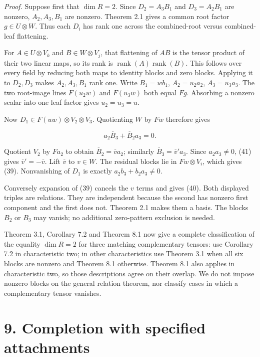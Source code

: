 \documentclass[11pt]{article}
\begin{document}
\emph{Proof.} Suppose first that $\dim R=2$. Since $D_2=A_3B_1$ and $D_3=A_2B_1$ are nonzero, $A_2,A_3,B_1$ are nonzero. Theorem 2.1 gives a common root factor $g\in U\otimes W$. Thus each $D_i$ has rank one across the combined-root versus combined-leaf flattening.


For $A\in U\otimes V_k$ and $B\in W\otimes V_j$, that flattening of $AB$ is the tensor product of their two linear maps, so its rank is $\operatorname{rank}(A)\operatorname{rank}(B)$. This follows over every field by reducing both maps to identity blocks and zero blocks. Applying it to $D_2,D_3$ makes $A_2,A_3,B_1$ rank one. Write $B_1=wb_1$, $A_2=u_2a_2$, $A_3=u_3a_3$. The two root-image lines $F(u_2w)$ and $F(u_3w)$ both equal $Fg$. Absorbing a nonzero scalar into one leaf factor gives $u_2=u_3=u$.


Now $D_1\in F(uw)\otimes V_2\otimes V_3$. Quotienting $W$ by $Fw$ therefore gives


\nopagebreak[4]

\begin{equation}
a_2\overline B_3+\overline B_2a_3=0.
\tag{41}
\end{equation}

Quotient $V_2$ by $Fa_2$ to obtain $\overline B_2=\overline v a_2$; similarly $\overline B_3=\overline v' a_3$. Since $a_2a_3\ne0$, (41) gives $\overline v'=-\overline v$. Lift $\overline v$ to $v\in W$. The residual blocks lie in $Fw\otimes V_i$, which gives (39). Nonvanishing of $D_1$ is exactly $a_2b_3+b_2a_3\ne0$.


Conversely expansion of (39) cancels the $v$ terms and gives (40). Both displayed triples are relations. They are independent because the second has nonzero first component and the first does not. Theorem 2.1 makes them a basis. The blocks $B_2$ or $B_3$ may vanish; no additional zero-pattern exclusion is needed.


Theorem 3.1, Corollary 7.2 and Theorem 8.1 now give a complete classification of the equality $\dim R=2$ for three matching complementary tensors: use Corollary 7.2 in characteristic two; in other characteristics use Theorem 3.1 when all six blocks are nonzero and Theorem 8.1 otherwise. Theorem 8.1 also applies in characteristic two, so those descriptions agree on their overlap. We do not impose nonzero blocks on the general relation theorem, nor classify cases in which a complementary tensor vanishes.


\section*{9. Completion with specified attachments}
\end{document}
